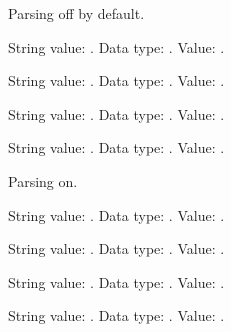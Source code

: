 \documentclass[12pt]{article}
\begin{document}
Parsing off by default. 

\DTLparse{}
String value: \result.
Data type: \DTLdatumtype{\result}.
Value: \DTLdatumvalue{\result}. 

\DTLparse{}
String value: \result.
Data type: \DTLdatumtype{\result}.
Value: \DTLdatumvalue{\result}. 

\DTLparse{}
String value: \result.
Data type: \DTLdatumtype{\result}.
Value: \DTLdatumvalue{\result}. 

\DTLparse{}
String value: \result.
Data type: \DTLdatumtype{\result}.
Value: \DTLdatumvalue{\result}. 

Parsing on. 

\DTLparse{}
String value: \result.
Data type: \DTLdatumtype{\result}.
Value: \DTLdatumvalue{\result}. 

\DTLparse{}
String value: \result.
Data type: \DTLdatumtype{\result}.
Value: \DTLdatumvalue{\result}. 

\DTLparse{}
String value: \result.
Data type: \DTLdatumtype{\result}.
Value: \DTLdatumvalue{\result}. 

\DTLparse{}
String value: \result.
Data type: \DTLdatumtype{\result}.
Value: \DTLdatumvalue{\result}. 
\end{document}

